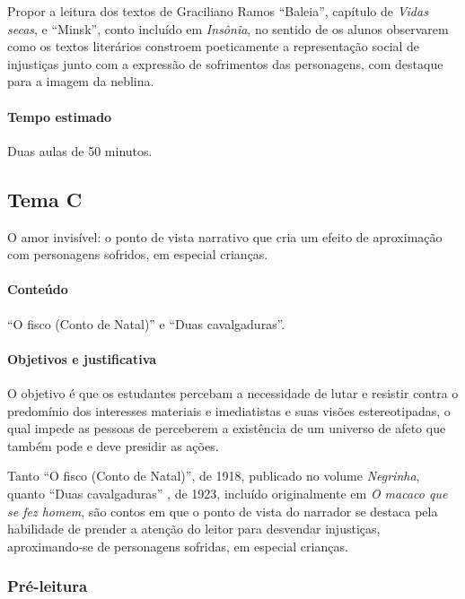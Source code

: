 \documentclass[12pt]{extarticle}
\begin{document}
Propor a leitura dos textos de Graciliano Ramos ``Baleia'', capítulo de
\emph{Vidas secas}, e ``Minsk'', conto incluído em \emph{Insônia}, no
sentido de os alunos observarem como os textos literários constroem
poeticamente a representação social de injustiças junto com a expressão
de sofrimentos das personagens, com destaque para a imagem da neblina.

\paragraph{Tempo estimado} Duas aulas de 50 minutos.

\subsection{Tema C}

O amor invisível: o ponto de vista narrativo que cria um efeito de
aproximação com personagens sofridos, em especial crianças.


\paragraph{Conteúdo} ``O fisco (Conto de Natal)'' e ``Duas cavalgaduras''.

\paragraph{Objetivos e justificativa}
O objetivo é que os estudantes percebam a necessidade de lutar e
resistir contra o predomínio dos interesses materiais e imediatistas e
suas visões estereotipadas, o qual impede as pessoas de perceberem a
existência de um universo de afeto que também pode e deve presidir as
ações.

Tanto ``O fisco (Conto de Natal)'', de 1918, publicado no volume
\emph{Negrinha}, quanto ``Duas cavalgaduras'' , de 1923, incluído
originalmente em \emph{O macaco que se fez homem}, são contos em que o
ponto de vista do narrador se destaca pela habilidade de prender a
atenção do leitor para desvendar injustiças, aproximando-se de
personagens sofridas, em especial crianças.

\subsubsection{Pré-leitura}
\end{document}
